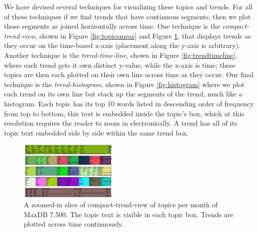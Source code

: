 \documentclass[times, 10pt,twocolumn]{article}
\begin{document}

We have devised several techniques for visualizing these topics and
trends.  For all of these techniques if we find trends that have
continuous segments, then we plot those segments as joined
horizontally across time. One technique is the \emph{compact-trend-view},
shown in Figure \ref{fig:topicsmear} and Figure \ref{fig:zoomedsmear},
that displays trends as they occur on the time-based x-axis
(placement along the y-axis is arbitrary).  Another technique is
the \emph{trend-time-line}, shown in Figure \ref{fig:trendtimeline}, where
each trend gets it own distinct y-value, while the x-axis is time;
these topics are then each plotted on their own line across time as
they occur. Our final technique is the \emph{trend-histogram}, shown in Figure
\ref{fig:histogram} where we plot each trend on its own line but stack
up the segments of the trend, much like a histogram. Each topic has its top 10 words 
listed in descending order of frequency from top to bottom, this text is embedded inside the topic's box, which at this resolution requires the reader to zoom in electronically.
A trend has all of its topic text embedded side by side within the same trend box.


\begin{figure}[t]
  \centering
  \includegraphics[width=0.42\textwidth]{fixed-time-smear-plot-cropped}
  \caption{A zoomed-in slice of compact-trend-view of topics per month of MaxDB 7.500. The topic text is visible in each topic box. Trends are plotted across time continuously.}
  \label{fig:zoomedsmear}
\end{figure}
\end{document}
